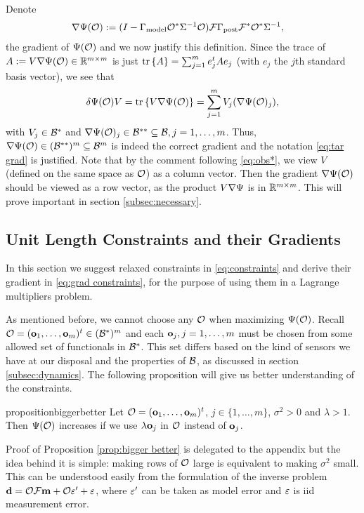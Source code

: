 \documentclass{amsart}
\numberwithin{equation}{section}
\begin{document}
Denote
\begin{align}\label{eq:tar grad}
  \nabla \Psi(\mathcal{O}) &:= (I - \Gamma_{\textup{model}} \mathcal{O}^* \Sigma^{-1} \mathcal{O}) \mathcal{F}
  \Gamma_{\textup{post}} \mathcal{F}^* \mathcal{O}^*\Sigma^{-1},
\end{align}
the gradient of $\Psi (\mathcal{O} )$ and we now justify this definition.
Since the trace of $A := V \nabla \Psi(\mathcal{O}) \in \mathbb{R}^{m \times m}$ is
just $\textup{tr}\left \{A \right \} = \sum_{j=1}^m e_j^t A e_j$ (with $e_j$ the $j$th standard
basis vector), we see that
\begin{align*}
  \delta \Psi(\mathcal{O})V = \textup{tr}\left \{V \nabla \Psi(\mathcal{O}) \right \} = \sum_{j=1}^m
  V_j(\nabla \Psi(\mathcal{O})_j),
\end{align*}
with $V_j \in \mathcal{B}^*$ and $\nabla \Psi(\mathcal{O})_j \in \mathcal{B}^{**}\subseteq
\mathcal{B}, j=1,\dots,m$. Thus, $\nabla \Psi( \mathcal{O} ) \in (\mathcal{B}^{**})^m
\subseteq \mathcal{B}^m$ is indeed the correct gradient and the notation
\eqref{eq:tar grad} is justified. Note that by the comment following
\eqref{eq:obs*}, we view $V$ (defined on the same space as $\mathcal{O}$) as
a column vector. Then the gradient $\nabla \Psi(\mathcal{O})$ should be
viewed as a row vector, as the product $V \nabla \Psi$ is in $\mathbb{R}^{m
  \times m}$. This will prove important in section
\ref{subsec:necessary}.

\subsection{Unit Length Constraints and their Gradients}\label{subsec:unit length}
In this section we suggest relaxed constraints in
\eqref{eq:constraints} and derive their gradient in \eqref{eq:grad
  constraints}, for the purpose of using them in a Lagrange
multipliers problem.

As mentioned before, we cannot choose any $\mathcal{O}$ when maximizing
$\Psi(\mathcal{O})$. Recall $\mathcal{O} = (\mathbf{o}_1,\dots,\mathbf{o}_m)^t \in (\mathcal{B}^*)^m$
and each $\mathbf{o}_j,j=1,\dots,m$ must be chosen from some allowed set of
functionals in $\mathcal{B}^*$. This set differs based on the kind of sensors
we have at our disposal and the properties of $\mathcal{B}$, as discussed in
section \ref{subsec:dynamics}. The following proposition will give us
better understanding of the constraints. 
\begin{restatable*}{proposition}{biggerbetter}\label{prop:bigger better}
  Let $\mathcal{O} = (\mathbf{o}_1,\dots,\mathbf{o}_m)^t$, $j \in \{1,\dots,m\}$, $\sigma^2
  > 0$ and $\lambda > 1$. Then $\Psi(\mathcal{O})$ increases if we use
  $\lambda \mathbf{o}_j$ in $\mathcal{O}$ instead of $\mathbf{o}_j$.
\end{restatable*}
Proof of Proposition \ref{prop:bigger better} is delegated to the
appendix but the idea behind it is simple: making rows of $\mathcal{O}$ large
is equivalent to making $\sigma^2$ small. This can be understood
easily from the formulation of the inverse problem $\mathbf{d} = \mathcal{O} \mathcal{F}
\mathbf{m} + \mathcal{O} \varepsilon' + \varepsilon$, where $\varepsilon'$ can be taken as model error
and $\varepsilon$ is iid measurement error.
\end{document}
